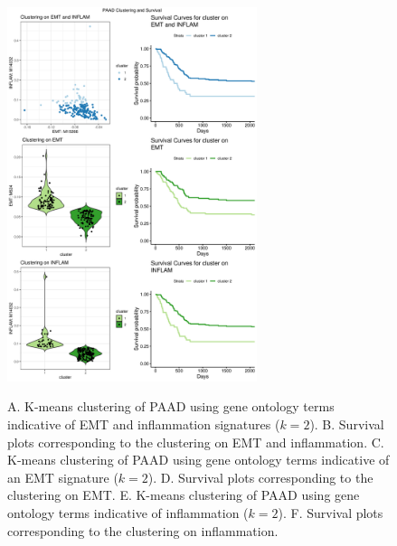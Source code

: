 \documentclass[11pt]{article}
\begin{document}
\begin{figure}
\center
{\includegraphics[width=0.65\textwidth]{Figure6/PAAD.pdf}}
\caption{A. K-means clustering of PAAD using gene ontology terms indicative of EMT and inflammation signatures ($k=2$).
B. Survival plots corresponding to the clustering on EMT and inflammation.
C. K-means clustering of PAAD using gene ontology terms indicative of an EMT signature ($k=2$).
D. Survival plots corresponding to the clustering on EMT.
E. K-means clustering of PAAD using gene ontology terms indicative of inflammation ($k=2$).
F. Survival plots corresponding to the clustering on inflammation.}
\label{fig:PAAD}
\end{figure}

\end{document}
